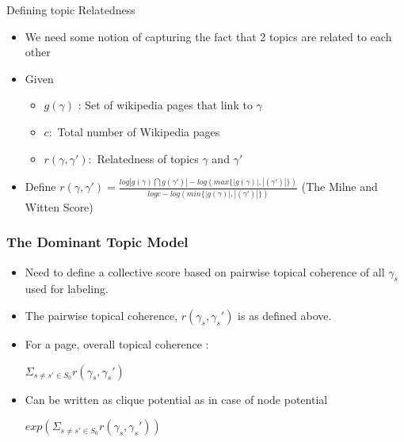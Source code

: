 \begin{frame}{Defining topic Relatedness}
  \begin{itemize}
   \item We need some notion of capturing the fact that 2 topics are related to each other \medskip
   \item Given
   \begin{itemize}
    \item $g(\gamma)$ : Set of wikipedia pages that link to $\gamma$
    \item $c :$ Total number of Wikipedia pages
    \item $r(\gamma, \gamma') :$ Relatedness of topics $\gamma$ and $\gamma'$
   \end{itemize}\bigskip

    
   \item Define $ r(\gamma, \gamma') = \frac{log|g(\gamma) \bigcap g(\gamma')| - log(max\{|g(\gamma)|, |(\gamma')|\})} {log c - log(min\{|g(\gamma)|, |(\gamma')|\})}$ 
  (The Milne and Witten Score)
  \end{itemize}

  
 \end{frame}

 
\begin{frame}
  \frametitle{The Dominant Topic Model}
  \begin{itemize}
   \item Need to define a collective score based on pairwise topical coherence of all $\gamma_s$ used for labeling. \medskip
   \item The pairwise topical coherence, $r(\gamma_s, \gamma_s')$ is as defined above.\medskip
   \item For a page, overall topical coherence : \begin{center}\medskip
                                                  $\Sigma_{s \neq s' \in S_0}r(\gamma_s, \gamma_s')$
                                                 \end{center}
   \item Can be written as clique potential as in case of node potential\medskip
      \begin{center}
	$exp(\Sigma_{s \neq s' \in S_0}r(\gamma_s, \gamma_s'))$
      \end{center}

  \end{itemize}

 \end{frame}

